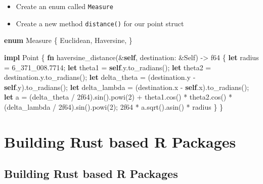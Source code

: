 \documentclass[
  letterpaper,
  DIV=11,
  numbers=noendperiod,
  oneside]{scrreprt}
\newenvironment{Shaded}{\begin{snugshade}}{\end{snugshade}}
\newcommand{\DataTypeTok}[1]{\textcolor[rgb]{0.68,0.00,0.00}{#1}}
\newcommand{\DecValTok}[1]{\textcolor[rgb]{0.68,0.00,0.00}{#1}}
\newcommand{\KeywordTok}[1]{\textcolor[rgb]{0.00,0.23,0.31}{\textbf{#1}}}
\newcommand{\NormalTok}[1]{\textcolor[rgb]{0.00,0.23,0.31}{#1}}
\newcommand{\OperatorTok}[1]{\textcolor[rgb]{0.37,0.37,0.37}{#1}}
\providecommand{\tightlist}{%
  \setlength{\itemsep}{0pt}\setlength{\parskip}{0pt}}\usepackage{longtable,booktabs,array}
\begin{document}
\begin{itemize}
\tightlist
\item
  Create an enum called \texttt{Measure}
\item
  Create a new method \texttt{distance()} for our point struct
\end{itemize}

\begin{Shaded}
\begin{Highlighting}[]
\KeywordTok{enum}\NormalTok{ Measure }\OperatorTok{\{}
\NormalTok{    Euclidean}\OperatorTok{,}
\NormalTok{    Haversine}\OperatorTok{,}
\OperatorTok{\}}

\KeywordTok{impl}\NormalTok{ Point }\OperatorTok{\{}
    \KeywordTok{fn}\NormalTok{ haversine\_distance(}\OperatorTok{\&}\KeywordTok{self}\OperatorTok{,}\NormalTok{ destination}\OperatorTok{:} \OperatorTok{\&}\DataTypeTok{Self}\NormalTok{) }\OperatorTok{{-}\textgreater{}} \DataTypeTok{f64} \OperatorTok{\{}
        \KeywordTok{let}\NormalTok{ radius }\OperatorTok{=} \DecValTok{6\_371\_008.7714}\OperatorTok{;}
        \KeywordTok{let}\NormalTok{ theta1 }\OperatorTok{=} \KeywordTok{self}\OperatorTok{.}\NormalTok{y}\OperatorTok{.}\NormalTok{to\_radians()}\OperatorTok{;}
        \KeywordTok{let}\NormalTok{ theta2 }\OperatorTok{=}\NormalTok{ destination}\OperatorTok{.}\NormalTok{y}\OperatorTok{.}\NormalTok{to\_radians()}\OperatorTok{;}
        \KeywordTok{let}\NormalTok{ delta\_theta }\OperatorTok{=}\NormalTok{ (destination}\OperatorTok{.}\NormalTok{y }\OperatorTok{{-}} \KeywordTok{self}\OperatorTok{.}\NormalTok{y)}\OperatorTok{.}\NormalTok{to\_radians()}\OperatorTok{;}
        \KeywordTok{let}\NormalTok{ delta\_lambda }\OperatorTok{=}\NormalTok{ (destination}\OperatorTok{.}\NormalTok{x }\OperatorTok{{-}} \KeywordTok{self}\OperatorTok{.}\NormalTok{x)}\OperatorTok{.}\NormalTok{to\_radians()}\OperatorTok{;}
        \KeywordTok{let}\NormalTok{ a }\OperatorTok{=}\NormalTok{ (delta\_theta }\OperatorTok{/} \DecValTok{2f64}\NormalTok{)}\OperatorTok{.}\NormalTok{sin()}\OperatorTok{.}\NormalTok{powi(}\DecValTok{2}\NormalTok{)}
            \OperatorTok{+}\NormalTok{ theta1}\OperatorTok{.}\NormalTok{cos() }\OperatorTok{*}\NormalTok{ theta2}\OperatorTok{.}\NormalTok{cos() }\OperatorTok{*}\NormalTok{ (delta\_lambda }\OperatorTok{/} \DecValTok{2f64}\NormalTok{)}\OperatorTok{.}\NormalTok{sin()}\OperatorTok{.}\NormalTok{powi(}\DecValTok{2}\NormalTok{)}\OperatorTok{;}
        \DecValTok{2f64} \OperatorTok{*}\NormalTok{ a}\OperatorTok{.}\NormalTok{sqrt()}\OperatorTok{.}\NormalTok{asin() }\OperatorTok{*}\NormalTok{ radius}
    \OperatorTok{\}}
\OperatorTok{\}}
\end{Highlighting}
\end{Shaded}

\part{Building Rust based R Packages}

\chapter{Building Rust based R
Packages}\label{building-rust-based-r-packages-1}
\end{document}
